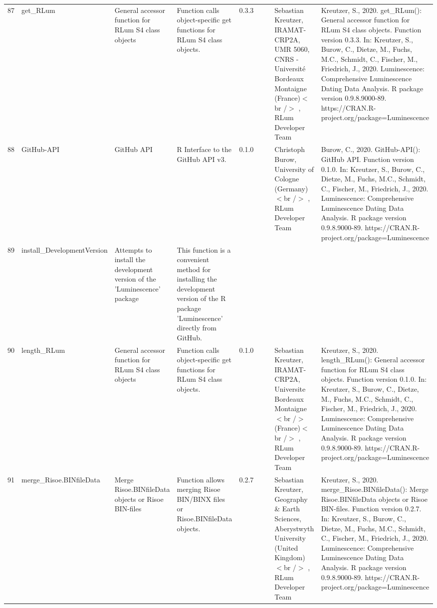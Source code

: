 \begin{table}[ht]
\begin{tabular}{rllllllll}
 \\ 
  87 & get\_RLum & General accessor function for RLum S4 class objects & Function calls object-specific get functions for RLum S4 class objects. & 0.3.3
 &  &  & Sebastian Kreutzer, IRAMAT-CRP2A, UMR 5060, CNRS - Université Bordeaux Montaigne (France)$<$br /$>$ , RLum Developer Team & Kreutzer, S., 2020. get\_RLum(): General accessor function for RLum S4 class objects. Function version 0.3.3. In: Kreutzer, S., Burow, C., Dietze, M., Fuchs, M.C., Schmidt, C., Fischer, M., Friedrich, J., 2020. Luminescence: Comprehensive Luminescence Dating Data Analysis. R package version 0.9.8.9000-89. https://CRAN.R-project.org/package=Luminescence
 \\ 
  88 & GitHub-API & GitHub API & R Interface to the GitHub API v3. & 0.1.0
 &  &  & Christoph Burow, University of Cologne (Germany)$<$br /$>$ , RLum Developer Team & Burow, C., 2020. GitHub-API(): GitHub API. Function version 0.1.0. In: Kreutzer, S., Burow, C., Dietze, M., Fuchs, M.C., Schmidt, C., Fischer, M., Friedrich, J., 2020. Luminescence: Comprehensive Luminescence Dating Data Analysis. R package version 0.9.8.9000-89. https://CRAN.R-project.org/package=Luminescence
 \\ 
  89 & install\_DevelopmentVersion & Attempts to install the development version of the 'Luminescence' package & This function is a convenient method for installing the development version of the R package 'Luminescence' directly from GitHub. &  &  &  &  &  \\ 
  90 & length\_RLum & General accessor function for RLum S4 class objects & Function calls object-specific get functions for RLum S4 class objects. & 0.1.0
 &  &  & Sebastian Kreutzer, IRAMAT-CRP2A, Universite Bordeaux Montaigne$<$br /$>$ (France)$<$br /$>$ , RLum Developer Team & Kreutzer, S., 2020. length\_RLum(): General accessor function for RLum S4 class objects. Function version 0.1.0. In: Kreutzer, S., Burow, C., Dietze, M., Fuchs, M.C., Schmidt, C., Fischer, M., Friedrich, J., 2020. Luminescence: Comprehensive Luminescence Dating Data Analysis. R package version 0.9.8.9000-89. https://CRAN.R-project.org/package=Luminescence
 \\ 
  91 & merge\_Risoe.BINfileData & Merge Risoe.BINfileData objects or Risoe BIN-files & Function allows merging Risoe BIN/BINX files or Risoe.BINfileData objects. & 0.2.7
 &  &  & Sebastian Kreutzer, Geography \& Earth Sciences, Aberystwyth University (United Kingdom)$<$br /$>$ , RLum Developer Team & Kreutzer, S., 2020. merge\_Risoe.BINfileData(): Merge Risoe.BINfileData objects or Risoe BIN-files. Function version 0.2.7. In: Kreutzer, S., Burow, C., Dietze, M., Fuchs, M.C., Schmidt, C., Fischer, M., Friedrich, J., 2020. Luminescence: Comprehensive Luminescence Dating Data Analysis. R package version 0.9.8.9000-89. https://CRAN.R-project.org/package=Luminescence

\end{tabular}
\end{table}
